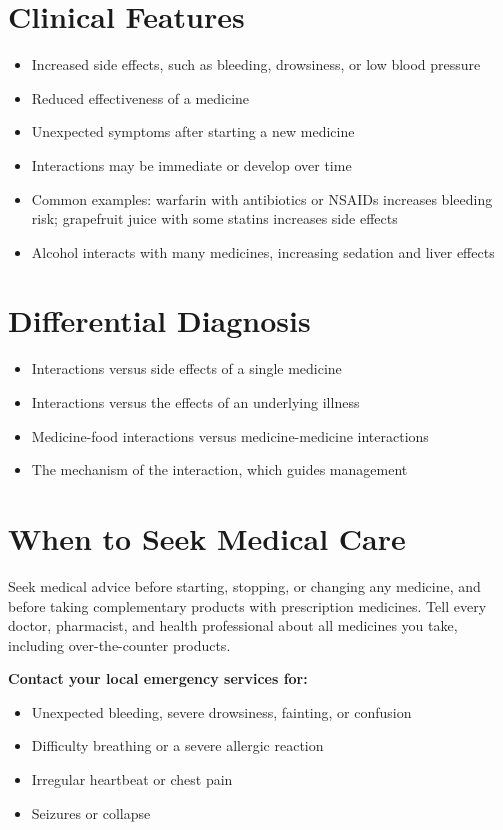 \section*{Clinical Features}
\begin{itemize}
    \item Increased side effects, such as bleeding, drowsiness, or low blood pressure
    \item Reduced effectiveness of a medicine
    \item Unexpected symptoms after starting a new medicine
    \item Interactions may be immediate or develop over time
    \item Common examples: warfarin with antibiotics or NSAIDs increases bleeding risk; grapefruit juice with some statins increases side effects
    \item Alcohol interacts with many medicines, increasing sedation and liver effects
\end{itemize}

\section*{Differential Diagnosis}
\begin{itemize}
    \item Interactions versus side effects of a single medicine
    \item Interactions versus the effects of an underlying illness
    \item Medicine-food interactions versus medicine-medicine interactions
    \item The mechanism of the interaction, which guides management
\end{itemize}

\section*{When to Seek Medical Care}
Seek medical advice before starting, stopping, or changing any medicine, and before taking complementary products with prescription medicines. Tell every doctor, pharmacist, and health professional about all medicines you take, including over-the-counter products.

\textbf{Contact your local emergency services for:}
\begin{itemize}
    \item Unexpected bleeding, severe drowsiness, fainting, or confusion
    \item Difficulty breathing or a severe allergic reaction
    \item Irregular heartbeat or chest pain
    \item Seizures or collapse
\end{itemize}

